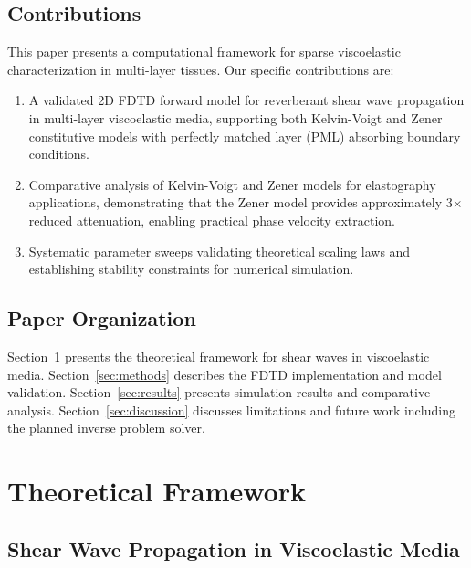 \documentclass[journal,twoside,a4paper]{IEEEtran}
\begin{document}
\subsection{Contributions}
This paper presents a computational framework for sparse viscoelastic 
characterization in multi-layer tissues. Our specific contributions are:

\begin{enumerate}
    \item A validated 2D FDTD forward model for reverberant shear wave 
    propagation in multi-layer viscoelastic media, supporting both 
    Kelvin-Voigt and Zener constitutive models with perfectly matched 
    layer (PML) absorbing boundary conditions.
    
    \item Comparative analysis of Kelvin-Voigt and Zener models for 
    elastography applications, demonstrating that the Zener model 
    provides approximately 3$\times$ reduced attenuation, enabling 
    practical phase velocity extraction.
    
    \item Systematic parameter sweeps validating theoretical scaling 
    laws and establishing stability constraints for numerical simulation.
\end{enumerate}

\subsection{Paper Organization}
Section~\ref{sec:theory} presents the theoretical framework for shear 
waves in viscoelastic media. Section~\ref{sec:methods} describes the 
FDTD implementation and model validation. Section~\ref{sec:results} 
presents simulation results and comparative analysis. 
Section~\ref{sec:discussion} discusses limitations and future work 
including the planned inverse problem solver.

\section{Theoretical Framework}
\label{sec:theory}

\subsection{Shear Wave Propagation in Viscoelastic Media}
\end{document}
